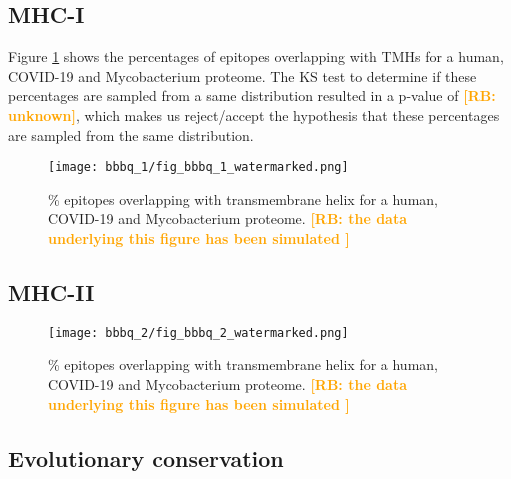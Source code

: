 \documentclass{article}
\newcommand{\richel}[1]{\textcolor{orange}{\textbf{[RB: #1]}}}
\begin{document}
\subsection{MHC-I}

Figure \ref{fig:1} shows the percentages of epitopes overlapping 
with TMHs for a human, COVID-19 and Mycobacterium proteome.
The KS test to determine if these percentages are sampled from
a same distribution resulted in a p-value of \richel{unknown},
which makes us reject/accept the hypothesis that these percentages
are sampled from the same distribution. 

\begin{figure}[!htbp]
  \texttt{[image: bbbq\_1/fig\_bbbq\_1\_watermarked.png]}
  \caption{
    \% epitopes overlapping with transmembrane helix
    for a human, COVID-19 and Mycobacterium proteome.
    \richel{
      the data underlying this figure has been simulated
    }
  }
  \label{fig:1}
\end{figure}

\subsection{MHC-II}

\begin{figure}[!htbp]
  \texttt{[image: bbbq\_2/fig\_bbbq\_2\_watermarked.png]}
  \caption{
    \% epitopes overlapping with transmembrane helix
    for a human, COVID-19 and Mycobacterium proteome.
    \richel{
      the data underlying this figure has been simulated
    }
  }
  \label{fig:2}
\end{figure}

\subsection{Evolutionary conservation}


\end{document}
